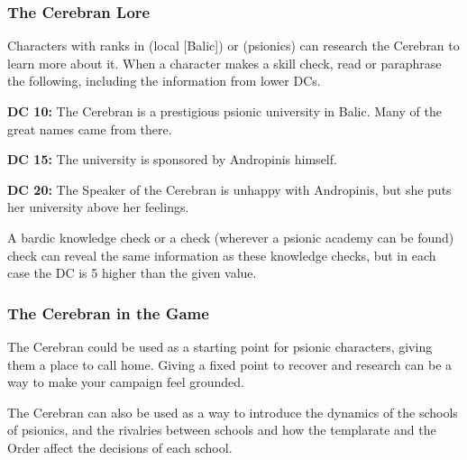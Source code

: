 \subsubsection{The Cerebran Lore}
Characters with ranks in  (local [Balic]) or  (psionics) can research the Cerebran to learn more about it. When a character makes a skill check, read or paraphrase the following, including the information from lower DCs.

\textbf{DC 10:} The Cerebran is a prestigious psionic university in Balic. Many of the great names came from there.

\textbf{DC 15:} The university is sponsored by Andropinis himself.

\textbf{DC 20:} The Speaker of the Cerebran is unhappy with Andropinis, but she puts her university above her feelings.

A bardic knowledge check or a  check (wherever a psionic academy can be found) check can reveal the same information as these knowledge checks, but in each case the DC is 5 higher than the given value.

\subsubsection{The Cerebran in the Game}
The Cerebran could be used as a starting point for psionic characters, giving them a place to call home. Giving a fixed point to recover and research can be a way to make your campaign feel grounded.

The Cerebran can also be used as a way to introduce the dynamics of the schools of psionics, and the rivalries between schools and how the templarate and the Order affect the decisions of each school.
